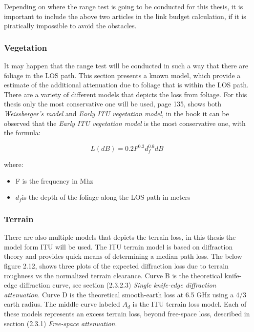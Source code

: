 Depending on where the range test is going to be conducted for this thesis, it is important to include the above two articles in the link budget calculation, if it is piratically impossible to avoid the obstacles. 

\subsubsection{Vegetation}
It may happen that the range test will be conducted in such a way that there are foliage in the LOS path. This section presents a known model, which provide a estimate of the additional attenuation due to foliage that is within the LOS path. There are a variety of different models that depicts the loss from foliage. For this thesis only the most conservative one will be used, \cite{RFpropagation} page 135, shows both \textit{Weissberger's model} and \textit{Early ITU vegetation model}, in the book it can be observed that the \textit{Early ITU vegetation model} is the most conservative one, with the formula:

\begin{equation}
    L(dB) = 0.2F^{0.3}d_f^{0.6} dB
\end{equation}

where:

\begin{itemize}
  \item F is the frequency in Mhz
  \item $d_f$is the depth of the foliage along the LOS path in meters
\end{itemize}

\subsubsection{Terrain}
There are also multiple models that depicts the terrain loss, in this thesis the model form ITU will be used. The ITU terrain model is based on diffraction theory and provides quick means of determining a median path loss. The below figure 2.12, shows three plots of the expected diffraction loss due to terrain roughness vs the normalized terrain clearance. Curve B is the theoretical knife-edge diffraction curve, see section (2.3.2.3) \textit{Single knife-edge diffraction attenuation}. Curve D is the theoretical smooth-earth loss at 6.5 GHz using a 4/3 earth radius. The middle curve labeled $A_d$ is the ITU terrain loss model. Each of these models represents an excess terrain loss, beyond free-space loss, described in section (2.3.1) \textit{Free-space attenuation}. 


